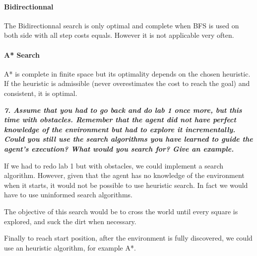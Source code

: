 \paragraph{Bidirectionnal}

The Bidirectionnal search is only optimal and complete when BFS is used on both side
with all step costs equals. However it is not applicable very often.

\paragraph{A* Search}

A* is complete in finite space but its optimality depends on the chosen heuristic.
If the heuristic is admissible (never overestimates the cost to reach the goal)
 and consistent, it is optimal.

\textit{\textbf{7. Assume that you had to go back and do lab 1 once more, but this time with obstacles. Remember that the agent did not have perfect knowledge of the environment but had to explore it incrementally. Could you still use the search algorithms you have learned to guide the agent's execution? What would you search for? Give an example.}}

If we had to redo lab 1 but with obstacles, we could implement a search algorithm.
However, given that the agent has no knowledge of the environment when it starts,
it would not be possible to use heuristic search. In fact we would have to use
uninformed search algorithms.

The objective of this search would be to cross the world until every square is explored,
and suck the dirt when necessary.

Finally to reach start position, after the environment is fully discovered,
we could use an heuristic algorithm, for example A*.
\thispagestyle{empty}
